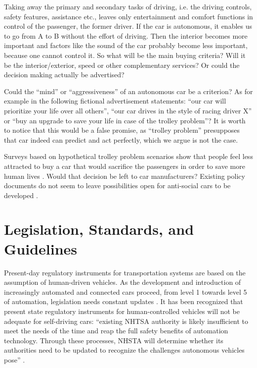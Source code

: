 Taking away the primary and secondary tasks of driving, i.e. the driving controls, safety features, assistance etc., leaves only entertainment and comfort functions in control of the passenger, the former driver. If the car is autonomous, it enables us to go from A to B without the effort of driving. Then the interior becomes more important and factors like the sound of the car probably become less important, because one cannot control it. So what will be the main buying criteria? Will it be the interior/exterior, speed or other complementary services? Or could the decision making actually be advertised? 

Could the \enquote{mind} or \enquote{aggressiveness} of an autonomous car be a criterion? As for example in the following fictional advertisement statements: \enquote{our car will prioritize your life over all others}, \enquote{our car drives in the style of racing driver X} or \enquote{buy an upgrade to save your life in case of the trolley problem}? It is worth to notice that this would be a false promise, as \enquote{trolley problem} presupposes that car indeed can predict and act perfectly, which we argue is not the case.

Surveys based on hypothetical trolley problem scenarios show that people feel less attracted to buy a car that would sacrifice the passengers in order to save more human lives \cite{Bonnefon2016}. Would that decision be left to car manufacturers? Existing policy documents do not seem to leave possibilities open for anti-social cars to be developed \cite{EthicsCommission2017pr,EthicsCommission2017b,Pillath2016,NHTSA2016PolicyUpdate,DBLP:journals/corr/CharisiDFLMSSWY17} .


\section{Legislation, Standards, and Guidelines}
\label{sec:LegislationStandardGuidelines}

Present-day regulatory instruments for transportation systems are based on the assumption of human-driven vehicles. As the development and introduction of increasingly automated and connected cars proceed, from level 1 towards level 5 of automation, legislation needs constant updates \cite{EthicsCommission2017pr,EthicsCommission2017b,Pillath2016,NHTSA2016PolicyUpdate}. It has been recognized that present state regulatory instruments for human-controlled vehicles will not be adequate for self-driving cars:  \enquote{existing NHTSA authority is likely insufficient to meet the needs of the time and reap the full safety benefits of automation technology. Through these processes, NHSTA will determine whether its authorities need to be updated to recognize the challenges autonomous vehicles pose} \cite{NHTSA2016PolicyUpdate}.

